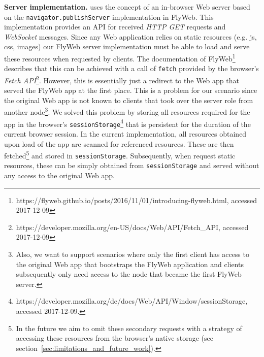 \noindent\textbf{Server implementation.}
\APIName uses the concept of an in-browser Web server based on the \texttt{navigator.publishServer} implementation in FlyWeb.
This implementation provides an API for received \textit{HTTP GET} requests and \textit{WebSocket} messages.
Since any Web application relies on static resources (e.g. js, css, images) our FlyWeb server implementation must be able to load and serve these resources when requested by clients.
The documentation of FlyWeb\footnote{https://flyweb.github.io/posts/2016/11/01/introducing-flyweb.html, accessed 2017-12-09} describes that this can be achieved with a call of \texttt{fetch} provided by the browser's \textit{Fetch API}\footnote{https://developer.mozilla.org/en-US/docs/Web/API/Fetch\_API, accessed 2017-12-09}.
However, this is essentially just a redirect to the Web app that served the FlyWeb app at the first place.
This is a problem for our scenario since the original Web app is not known to clients that took over the server role from another node\footnote{Also, we want to support scenarios where only the first client has access to the original Web app that bootstraps the FlyWeb application and clients subsequently only need access to the node that became the first FlyWeb server.}.
We solved this problem by storing all resources required for the \APIshort app in the browser's \texttt{sessionStorage}\footnote{https://developer.mozilla.org/de/docs/Web/API/Window/sessionStorage, accessed 2017-12-09.} that is persistent for the duration of the current browser session.
In the current implementation, all resources obtained upon load of the app are scanned for referenced resources.
These are then fetched\footnote{In the future we aim to omit these secondary requests with a strategy of accessing these resources from the browser's native storage (see section~\ref{sec:limitations_and_future_work}).} and stored in \texttt{sessionStorage}.
Subsequently, when \APIshort request static resources, these can be simply obtained from \texttt{sessionStorage} and served without any access to the original Web app.